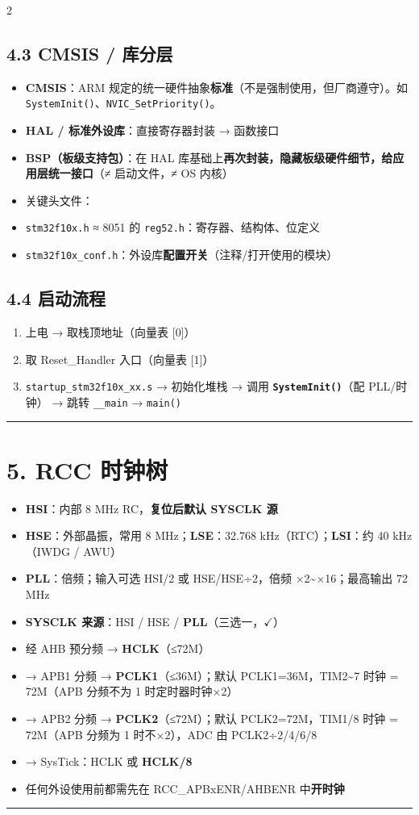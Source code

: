 \documentclass[UTF8,zihao=-5]{ctexart}
\newcommand{\okmark}{\ensuremath{\checkmark}}
\begin{document}
\begin{multicols*}{2}
\subsection*{4.3 CMSIS / 库分层}
\begin{itemize}
\item \textbf{CMSIS}：ARM 规定的统一硬件抽象\textbf{标准}（不是强制使用，但厂商遵守）。如 \texttt{SystemInit()}、\texttt{NVIC\_SetPriority()}。
\item \textbf{HAL / 标准外设库}：直接寄存器封装 → 函数接口
\item \textbf{BSP（板级支持包）}：在 HAL 库基础上\textbf{再次封装，隐藏板级硬件细节，给应用层统一接口}（≠ 启动文件，≠ OS 内核）
\item 关键头文件：
\item \texttt{stm32f10x.h} ≈ 8051 的 \texttt{reg52.h}：寄存器、结构体、位定义
\item \texttt{stm32f10x\_conf.h}：外设库\textbf{配置开关}（注释/打开使用的模块）
\end{itemize}
\subsection*{4.4 启动流程}
\begin{enumerate}
\item 上电 → 取栈顶地址（向量表 [0]）
\item 取 Reset\_Handler 入口（向量表 [1]）
\item \texttt{startup\_stm32f10x\_xx.s} → 初始化堆栈 → 调用 \textbf{\texttt{SystemInit()}}（配 PLL/时钟） → 跳转 \texttt{\_\_main} → \texttt{main()}
\end{enumerate}
\vspace{1pt}\hrule\vspace{1pt}
\section*{5. RCC 时钟树}
\begin{itemize}
\item \textbf{HSI}：内部 8 MHz RC，\textbf{复位后默认 SYSCLK 源}
\item \textbf{HSE}：外部晶振，常用 8 MHz；\textbf{LSE}：32.768 kHz（RTC）；\textbf{LSI}：约 40 kHz（IWDG / AWU）
\item \textbf{PLL}：倍频；输入可选 HSI/2 或 HSE/HSE÷2，倍频 ×2\textasciitilde{}×16；最高输出 72 MHz
\item \textbf{SYSCLK 来源}：HSI / HSE / \textbf{PLL}（三选一，\okmark）
\item 经 AHB 预分频 → \textbf{HCLK}（≤72M）
\item → APB1 分频 → \textbf{PCLK1}（≤36M）；默认 PCLK1=36M，TIM2\textasciitilde{}7 时钟 = 72M（APB 分频不为 1 时定时器时钟×2）
\item → APB2 分频 → \textbf{PCLK2}（≤72M）；默认 PCLK2=72M，TIM1/8 时钟 = 72M（APB 分频为 1 时不×2），ADC 由 PCLK2÷2/4/6/8
\item → SysTick：HCLK 或 \textbf{HCLK/8}
\item 任何外设使用前都需先在 RCC\_APBxENR/AHBENR 中\textbf{开时钟}
\end{itemize}
\vspace{1pt}\hrule\vspace{1pt}

\end{multicols*}
\end{document}
